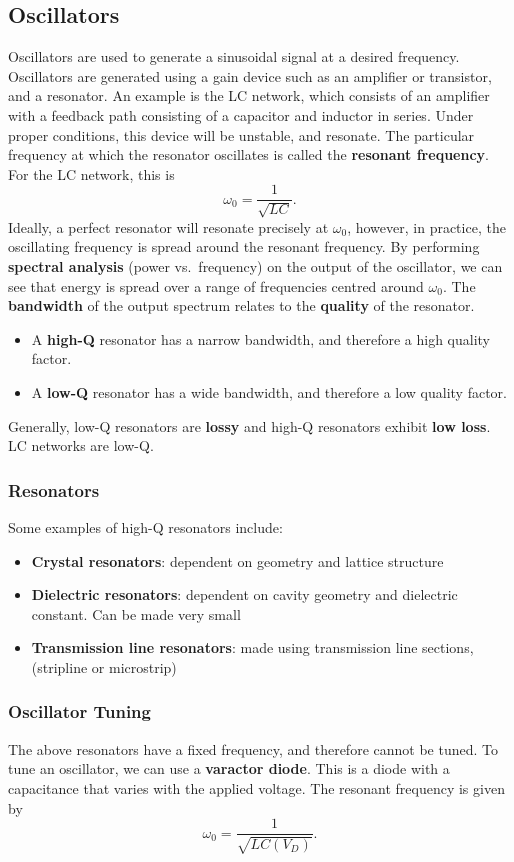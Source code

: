 \documentclass{article}
\begin{document}
\subsection{Oscillators}
Oscillators are used to generate a sinusoidal signal at a desired
frequency. Oscillators are generated using a gain device such as an
amplifier or transistor, and a resonator. An example is the LC network,
which consists of an amplifier with a feedback path consisting of a
capacitor and inductor in series. Under proper conditions, this device
will be unstable, and resonate. The particular frequency at which the
resonator oscillates is called the \textbf{resonant frequency}. For
the LC network, this is
\begin{equation*}
    \omega_0 = \frac{1}{\sqrt{LC}}.
\end{equation*}
Ideally, a perfect resonator will resonate precisely at \(\omega_0\),
however, in practice, the oscillating frequency is spread around the
resonant frequency. By performing \textbf{spectral analysis}
(power vs.\ frequency) on the output of the oscillator, we can see that
energy is spread over a range of frequencies centred around \(\omega_0\).
The \textbf{bandwidth} of the output spectrum relates to the
\textbf{quality} of the resonator.
\begin{itemize}
    \item A \textbf{high-Q} resonator has a narrow bandwidth, and
          therefore a high quality factor.
    \item A \textbf{low-Q} resonator has a wide bandwidth, and
          therefore a low quality factor.
\end{itemize}
Generally, low-Q resonators are \textbf{lossy} and high-Q resonators
exhibit \textbf{low loss}. LC networks are low-Q.
\subsubsection{Resonators}
Some examples of high-Q resonators include:
\begin{itemize}
    \item \textbf{Crystal resonators}: dependent on geometry and lattice structure
    \item \textbf{Dielectric resonators}: dependent on cavity geometry and dielectric constant. Can be made very small
    \item \textbf{Transmission line resonators}: made using transmission line sections, (stripline or microstrip)
\end{itemize}
\subsubsection{Oscillator Tuning}
The above resonators have a fixed frequency, and therefore cannot be
tuned. To tune an oscillator, we can use a \textbf{varactor diode}.
This is a diode with a capacitance that varies with the applied
voltage. The resonant frequency is given by
\begin{equation*}
    \omega_0 = \frac{1}{\sqrt{L C\left( V_D \right)}}.
\end{equation*}
\end{document}

